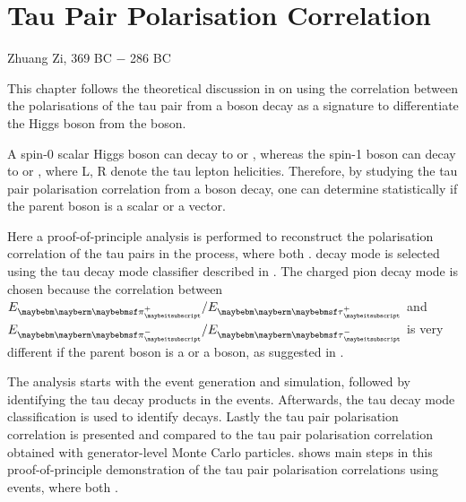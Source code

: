 \chapter{Tau Pair Polarisation Correlation}
\label{chap:Tau2Mini}

%
{Zhuang Zi, 369 BC $-$ 286 BC}%




This chapter follows the theoretical discussion in  on using the correlation between the polarisations of the tau pair from a boson decay as a signature to differentiate the Higgs boson from the \PZ boson.

A  spin-0 scalar Higgs boson can decay to  or , whereas the  spin-1 \PZ  boson can decay to  or , where L, R denote the tau lepton helicities. Therefore, by studying the tau pair polarisation correlation from a boson decay, one can determine statistically if the parent boson is a  scalar or a vector.

Here a proof-of-principle analysis  is performed to reconstruct the polarisation correlation of the tau pairs in the \ZToTauTau process, where both \tauToPionBoth. \tauToPionBoth decay mode is selected using the tau decay mode classifier described in . The charged pion decay mode is chosen because the correlation between $E_{\Ppiplus} / E_{\APtauon}$ and $E_{\Ppiminus} / E_{\Ptauon}$ is very different if the parent boson is a \PZ or a \PHiggs boson, as suggested in .


The analysis starts with the event generation and simulation, followed by identifying the tau decay products in the events. Afterwards, the tau decay mode classification is used to identify \tauToPionBoth decays. Lastly the tau pair polarisation correlation is presented and compared to  the tau pair polarisation correlation obtained with generator-level Monte Carlo particles.  shows main steps in this proof-of-principle demonstration of the tau pair polarisation correlations using  \eeZZQQ events, where both \tauToPionBoth.



